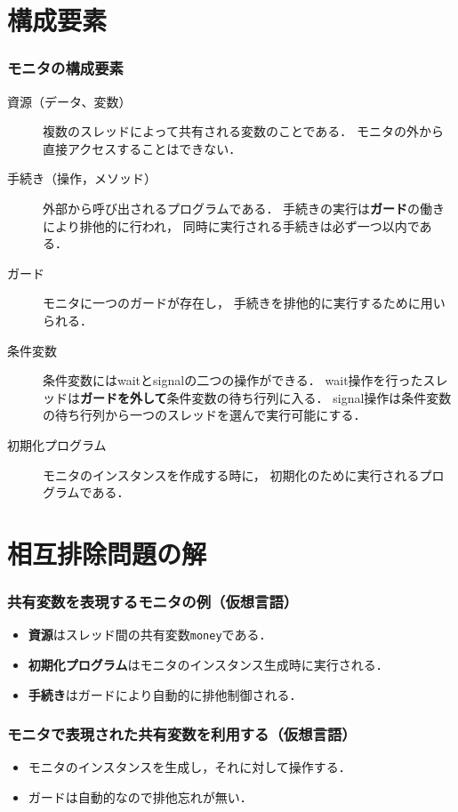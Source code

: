 \documentclass[dvipdfmx]{beamer}
\begin{document}
\section{構成要素}
\begin{frame}
  \frametitle{モニタの構成要素}
\begin{description}
\item [資源（データ、変数）]
複数のスレッドによって共有される変数のことである．
モニタの外から直接アクセスすることはできない．

\item [手続き（操作，メソッド）]
外部から呼び出されるプログラムである．
手続きの実行は{\bf ガード}の働きにより排他的に行われ，
同時に実行される手続きは必ず一つ以内である．

\item [ガード]
モニタに一つのガードが存在し，
手続きを排他的に実行するために用いられる．

\item [条件変数]
条件変数にはwaitとsignalの二つの操作ができる．
wait操作を行ったスレッドは{\bf ガードを外して}条件変数の待ち行列に入る．
signal操作は条件変数の待ち行列から一つのスレッドを選んで実行可能にする．

\item [初期化プログラム]
モニタのインスタンスを作成する時に，
初期化のために実行されるプログラムである．
\end{description}
\end{frame}

\section{相互排除問題の解}
\begin{frame}
  \frametitle{共有変数を表現するモニタの例（仮想言語）}
  

  \begin{itemize}
  \item {\bf 資源}はスレッド間の共有変数{\tt money}である．
  \item {\bf 初期化プログラム}はモニタのインスタンス生成時に実行される．
  \item {\bf 手続き}はガードにより自動的に排他制御される．
  \end{itemize}
\end{frame}

\begin{frame}
  \frametitle{モニタで表現された共有変数を利用する（仮想言語）}
  

  \begin{itemize}
  \item モニタのインスタンスを生成し，それに対して操作する．
  \item ガードは自動的なので排他忘れが無い．
  \end{itemize}
\end{frame}
\end{document}

